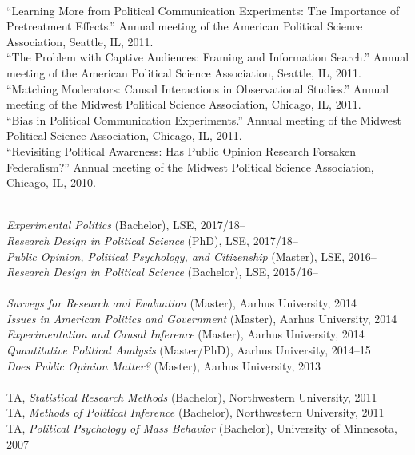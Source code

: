\documentclass[12pt]{article}
\renewcommand{\section}[1]{\pagebreak[3]%
    \llap{\scshape\smash{\parbox[t]{\marginparwidth}{\raggedright {\color{lg}#1}}}}%
    \vspace{-\baselineskip}\par}
\newcommand{\topic}[1]{\pagebreak[3]\indent {\color{lg}{\footnotesize #1 }}\\}
\newcommand{\entry}[1]{\indent {\color{lg}\guillemotright}\hspace{2pt}#1\vspace{.25em}\\}
\begin{document}
	\topic{Conference Papers (2011 and earlier)}
	\entry{``Learning More from Political Communication Experiments: The Importance of Pretreatment Effects.'' Annual meeting of the American Political Science Association, Seattle, IL, 2011.}
	\entry{``The Problem with Captive Audiences: Framing and Information Search.'' Annual meeting of the American Political Science Association, Seattle, IL, 2011.}
	\entry{``Matching Moderators: Causal Interactions in Observational Studies.'' Annual meeting of the Midwest Political Science Association, Chicago, IL, 2011.}
	\entry{``Bias in Political Communication Experiments.'' Annual meeting of the Midwest Political Science Association, Chicago, IL, 2011.}
	\entry{``Revisiting Political Awareness: Has Public Opinion Research Forsaken Federalism?'' Annual meeting of the Midwest Political Science Association, Chicago, IL, 2010.}

\section{Teaching \&\\ Advising}
\topic{Lecturing: London School of Economics and Political Science}
	\entry{\textit{Experimental Politics} (Bachelor), LSE, 2017/18--}
	\entry{\textit{Research Design in Political Science} (PhD), LSE, 2017/18--}
	\entry{\textit{Public Opinion, Political Psychology, and Citizenship} (Master), LSE, 2016--}
	\entry{\textit{Research Design in Political Science} (Bachelor), LSE, 2015/16--}

\topic{Lecturing: Aarhus University}
	\entry{\textit{Surveys for Research and Evaluation} (Master), Aarhus University, 2014}
	\entry{\textit{Issues in American Politics and Government} (Master), Aarhus University, 2014}
	\entry{\textit{Experimentation and Causal Inference} (Master), Aarhus University, 2014}
	\entry{\textit{Quantitative Political Analysis} (Master/PhD), Aarhus University, 2014--15}
	\entry{\textit{Does Public Opinion Matter?} (Master), Aarhus University, 2013}

\topic{Class Teaching: Northwestern University}
	\entry{TA, \textit{Statistical Research Methods} (Bachelor), Northwestern University, 2011} %
	\entry{TA, \textit{Methods of Political Inference} (Bachelor), Northwestern University, 2011} %
	\entry{TA, \textit{Political Psychology of Mass Behavior} (Bachelor), University of Minnesota, 2007} %
\end{document}
